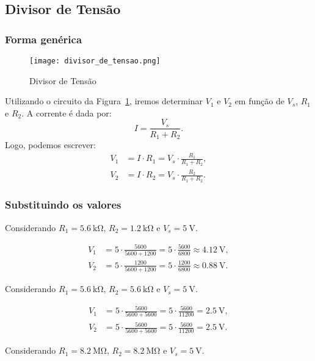 \documentclass[a4paper, 12pt]{article}
\begin{document}
\subsection{Divisor de Tensão}
\subsubsection{Forma genérica}

\begin{figure}[H]
\centering
\texttt{[image: divisor\_de\_tensao.png]}
\caption{Divisor de Tensão}
\label{fig:divisor_de_tensao}
\end{figure}

Utilizando o circuito da Figura~\ref{fig:divisor_de_tensao}, iremos determinar $V_1$ e $V_2$ em função de $V_s$, $R_1$ e $R_2$.
A corrente é dada por:
\begin{equation}
I = \frac{V_s}{R_1 + R_2}.
\end{equation}
Logo, podemos escrever:
\begin{align}
V_1 &= I \cdot R_1 = V_s \cdot \frac{R_1}{R_1 + R_2}, \\[6pt]
V_2 &= I \cdot R_2 = V_s \cdot \frac{R_2}{R_1 + R_2}.
\end{align}

\subsubsection{Substituindo os valores}
Considerando $R_1 = \SI{5.6}{\kilo\ohm}$, $R_2 = \SI{1.2}{\kilo\ohm}$ e $V_s = \SI{5}{\volt}$.

\begin{align*}
V_1 &= 5 \cdot \frac{5600}{5600 + 1200} 
= 5 \cdot \frac{5600}{6800} 
\approx \SI{4,12}{\volt}, \\[6pt]
V_2 &= 5 \cdot \frac{1200}{5600 + 1200} 
= 5 \cdot \frac{1200}{6800} 
\approx \SI{0,88}{\volt}.
\end{align*}

Considerando $R_1 = \SI{5.6}{\kilo\ohm}$, $R_2 = \SI{5.6}{\kilo\ohm}$ e $V_s = \SI{5}{\volt}$.

\begin{align*}
V_1 &= 5 \cdot \frac{5600}{5600 + 5600} 
= 5 \cdot \frac{5600}{11200} 
= \SI{2,5}{\volt}, \\[6pt]
V_2 &= 5 \cdot \frac{5600}{5600 + 5600} 
= 5 \cdot \frac{5600}{11200} 
= \SI{2,5}{\volt}.
\end{align*}

Considerando $R_1 = \SI{8.2}{\mega\ohm}$, $R_2 = \SI{8.2}{\mega\ohm}$ e $V_s = \SI{5}{\volt}$.
\end{document}
